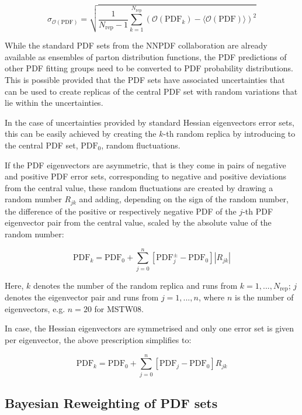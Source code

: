 \begin{equation}
\sigma_{\mathcal{O}(\mathrm{PDF})} = \sqrt{  \frac{1}{N_{\mathrm{rep}} - 1 }  \sum_{k=1}^{N_{\mathrm{rep}}} 
( \mathcal{O}(\mathrm{PDF}_k) - \langle \mathcal{O}(\mathrm{PDF})  \rangle   )^2     
     }
\end{equation}

While the standard PDF sets from the NNPDF collaboration are already available as ensembles of parton distribution functions, the PDF predictions of other PDF fitting groups need to be converted to PDF probability distributions. This is possible provided that the PDF sets have associated uncertainties that can be used to create replicas of the central PDF set with random variations that lie within the uncertainties. 

In the case of uncertainties provided by standard Hessian eigenvectors error sets, this can be easily achieved by creating the $k$-th random replica by introducing to the central PDF set, $\mathrm{PDF}_0$, random fluctuations. 

If the PDF eigenvectors are asymmetric, that is they come in pairs of negative and positive PDF error sets, corresponding to negative and positive deviations from the central value, these random fluctuations are created by drawing a random number $R_{jk}$ and adding, depending on the sign of the random number, the difference of the positive or respectively negative PDF of the $j$-th PDF eigenvector pair from the central value, scaled by the absolute value of the random number:

\begin{equation}
 \mathrm{PDF}_k = \mathrm{PDF}_0  + \sum_{j=0}^{n} \left[ \mathrm{PDF}^{\pm}_j - \mathrm{PDF}_0 \right] |R_{jk}|
\end{equation}
 
Here, $k$ denotes the number of the random replica and runs from $k=1, ... , N_\mathrm{rep}$; $j$ denotes the eigenvector pair and runs from $j=1, ..., n$, where $n$ is the number of eigenvectors, e.g. $n=20$ for MSTW08. 

In case, the Hessian eigenvectors are symmetrised and only one error set is given per eigenvector, the above prescription simplifies to:
   
\begin{equation}
 \mathrm{PDF}_k = \mathrm{PDF}_0  + \sum_{j=0}^{n} \left[ \mathrm{PDF}_j - \mathrm{PDF}_0 \right] R_{jk}
\end{equation}

\subsection{Bayesian Reweighting of PDF sets}

